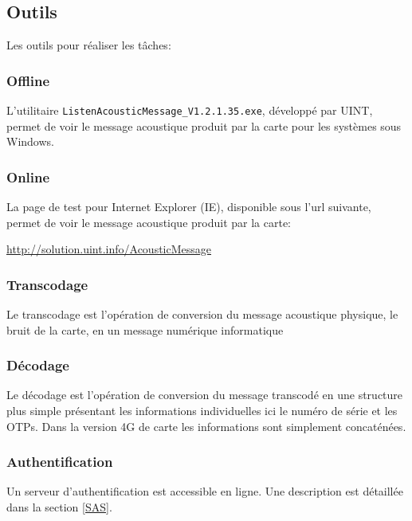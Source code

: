 \subsection{Outils}

Les outils pour réaliser les tâches:

\subsubsection{Offline}

L’utilitaire \texttt{ListenAcousticMessage\_V1.2.1.35.exe}, développé par UINT, permet de voir le message acoustique produit par la carte pour les systèmes sous Windows.

\subsubsection{Online}

La page de test pour Internet Explorer (IE), disponible sous l’url suivante, permet de voir le message acoustique produit par la carte: 

\url{http://solution.uint.info/AcousticMessage}

\subsubsection{Transcodage}

Le transcodage est l’opération de conversion du message acoustique physique, le bruit de la carte, en un message numérique informatique
 
\subsubsection{Décodage}

Le décodage est l’opération de conversion du message transcodé en une structure plus simple présentant les informations individuelles ici le numéro de série et les OTPs. Dans la version 4G de carte les informations sont simplement concaténées.
 
\subsubsection{Authentification}

Un serveur d’authentification est accessible en ligne. Une description est détaillée dans la section \ref{SAS}.


\newpage
